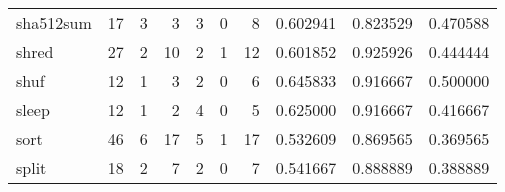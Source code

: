 \begin{longtable}{lrrrrrrrrr}
sha512sum &                                      17 &                                                  3 &                                                  3 &                                                  3 &                                                  0 &                                                  8 &                                           0.602941 &                               0.823529 &                             0.470588 \\
shred     &                                      27 &                                                  2 &                                                 10 &                                                  2 &                                                  1 &                                                 12 &                                           0.601852 &                               0.925926 &                             0.444444 \\
shuf      &                                      12 &                                                  1 &                                                  3 &                                                  2 &                                                  0 &                                                  6 &                                           0.645833 &                               0.916667 &                             0.500000 \\
sleep     &                                      12 &                                                  1 &                                                  2 &                                                  4 &                                                  0 &                                                  5 &                                           0.625000 &                               0.916667 &                             0.416667 \\
sort      &                                      46 &                                                  6 &                                                 17 &                                                  5 &                                                  1 &                                                 17 &                                           0.532609 &                               0.869565 &                             0.369565 \\
split     &                                      18 &                                                  2 &                                                  7 &                                                  2 &                                                  0 &                                                  7 &                                           0.541667 &                               0.888889 &                             0.388889 \\

\end{longtable}
